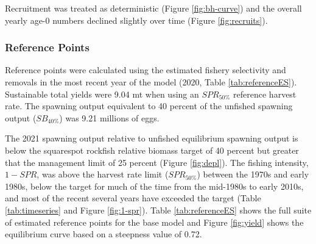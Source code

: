 \documentclass[11pt,
  english,
  a4paper,
]{article}
\begin{document}
Recruitment was treated as deterministic (Figure \ref{fig:bh-curve}) and the overall yearly age-0 numbers declined slightly over time (Figure \ref{fig:recruits}).

\leavevmode\tagmcend\tagstructend\par


\hypertarget{reference-points}{%
\subsubsection{Reference Points}\label{reference-points}}

\leavevmode\tagmcend\tagstructend


Reference points were calculated using the estimated fishery selectivity and removals in the most recent year of the model (2020, Table \ref{tab:referenceES}). Sustainable total yields were 9.04 mt when using an {\(SPR_{50\%}\)\leavevmode\tagmcend\tagstructend} reference harvest rate. The spawning output equivalent to 40 percent of the unfished spawning output ({\(SB_{40\%}\)\leavevmode\tagmcend\tagstructend}) was 9.21 millions of eggs.

\leavevmode\tagmcend\tagstructend\par


The 2021 spawning output relative to unfished equilibrium spawning output is below the squarespot rockfish relative biomass target of 40 percent but greater that the management limit of 25 percent (Figure \ref{fig:depl}). The fishing intensity, {\(1-SPR\)\leavevmode\tagmcend\tagstructend}, was above the harvest rate limit ({\(SPR_{50\%}\)\leavevmode\tagmcend\tagstructend}) between the 1970s and early 1980s, below the target for much of the time from the mid-1980s to early 2010s, and most of the recent several years have exceeded the target (Table \ref{tab:timeseries} and Figure \ref{fig:1-spr}). Table \ref{tab:referenceES} shows the full suite of estimated reference points for the base model and Figure \ref{fig:yield} shows the equilibrium curve based on a steepness value of 0.72.

\leavevmode\tagmcend\tagstructend\par
\end{document}
